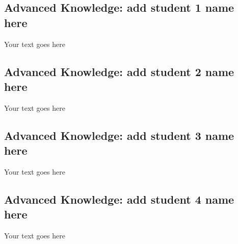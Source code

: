 \documentclass[a4paper, 11pt]{report}
\begin{document}
	\subsection{Advanced Knowledge: add student 1 name here}
	
	Your text goes here
	
	\subsection{Advanced Knowledge: add student 2 name here}
	
	Your text goes here
	
	\subsection{Advanced Knowledge: add student 3 name here}
	
	Your text goes here
	
	\subsection{Advanced Knowledge: add student 4 name here}
	
	Your text goes here
	
	
	
	
	\newpage
	
	
	
\end{document}
